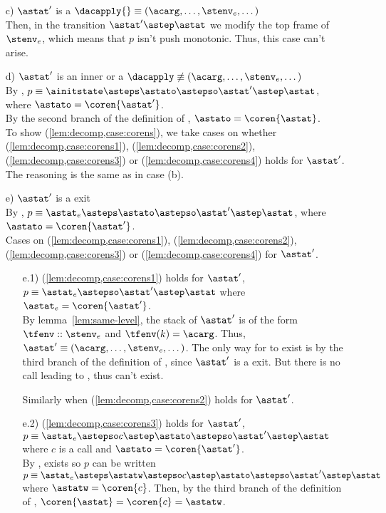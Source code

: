 \documentclass{LMCS}
\theoremstyle{definition} \newtheorem{property}[thm]{Property}
\begin{document}
\begin{enumerate}[$\bullet$]
\item[c)]
  $\astat'$ is a $\dacapply{} \equiv (\acarg, \dots, \stenv_e, \dots)$ \\
  Then, in the transition $\astat' \astep \astat$ 
  we modify the top frame of $\stenv_e$, 
  which means that $p$ isn't push monotonic.
  Thus, this case can't arise.
\item[d)]
  $\astat'$ is an inner \daceval{}
  or a $\dacapply \not\equiv (\acarg, \dots, \stenv_e, \dots)$ \\
  By \ih{},
  $p \equiv \ainitstate \asteps \astato \astepso \astat' 
  \astep \astat$,
  where $\astato = \coren{\astat'}$. \\
  By the second branch of the definition of \dcoren{}, 
  $\astato = \coren{\astat}$.\\
  To show (\ref{lem:decomp,case:corens}), we take cases on whether 
  (\ref{lem:decomp,case:corens1}),
  (\ref{lem:decomp,case:corens2}),
  (\ref{lem:decomp,case:corens3})
  or (\ref{lem:decomp,case:corens4})
  holds for $\astat'$.
  The reasoning is the same as in case (b).
\item[e)]
  $\astat'$ is a \daceval{} exit \\
  By \ih{},
  $p \equiv \entry \asteps \astato \astepso \astat' 
  \astep \astat$,
  where $\astato = \coren{\astat'}$. \\
  Cases on (\ref{lem:decomp,case:corens1}), (\ref{lem:decomp,case:corens2}),
  (\ref{lem:decomp,case:corens3}) or (\ref{lem:decomp,case:corens4})
  for $\astat'$.
  \begin{enumerate}[$\bullet$]
  \item[e.1)]
    (\ref{lem:decomp,case:corens1}) holds for $\astat'$, \ie \\
    $p \equiv \entry \astepso \astat' \astep \astat$
    where $\entry = \coren{\astat'}$. \\
    By lemma~\ref{lem:same-level}, 
    the stack of $\astat'$ is of the form $\tfenv::\stenv_e$ and
    $\tfenv(k) = \acarg$.
    Thus, $\astat' \equiv (\acarg, \dots, \stenv_e, \dots)$.
    The only way for \coren{\astat} to exist is by the third branch of the
    definition of \dcoren{}, since $\astat'$ is a \daceval{} exit.
    But there is no call leading to \entry,
    thus \coren{\astat} can't exist.

    Similarly when (\ref{lem:decomp,case:corens2}) holds for $\astat'$.
  \item[e.2)]
    (\ref{lem:decomp,case:corens3}) holds for $\astat'$, \ie \\
    $p \equiv \entry \astepso c \astep \astato \astepso \astat' \astep
    \astat$ where $c$ is a call and $\astato = \coren{\astat'}$. \\
    By \ih{},  exists so $p$ can be written 
    $p \equiv \entry \asteps \astatw \astepso c \astep \astato 
    \astepso \astat' \astep \astat$ where $\astatw = \coren{c}$.
    Then, by the third branch of the definition of \dcoren{}, 
    $\coren{\astat} = \coren{c} = \astatw$. 


\end{enumerate}
\end{enumerate}
\end{document}
